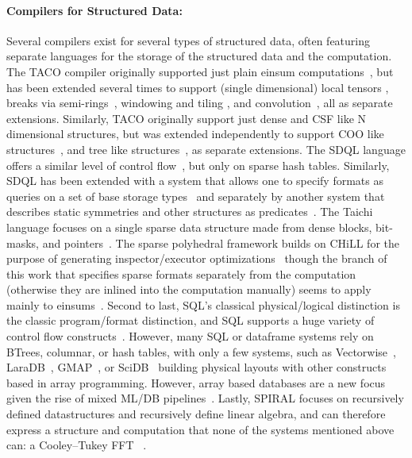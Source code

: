 \paragraph{ Compilers for Structured Data:}
Several compilers exist for several types of structured data, often featuring separate languages for the storage of the structured data and the computation.
%
The TACO compiler originally supported just plain einsum computations~\cite{kjolstad_tensor_2017}, but has been extended several times to support (single dimensional) local tensors \cite{kjolstad_tensor_2019}, breaks via semi-rings~\cite{henry_compilation_2021}, windowing and tiling \cite{senanayake2020sparse}, and convolution~\cite{won2023unified}, all as separate extensions.
%
Similarly, TACO originally support just dense and CSF like N dimensional structures, but was extended independently to support COO like structures~\cite{chou2018format}, and tree like structures~\cite{chou2022compilation}, as separate extensions.
%
The SDQL language offers a similar level of control flow~\cite{shaikhha2022functional}, but only on sparse hash tables.
%
Similarly, SDQL has been extended with a system that allows one to specify formats as queries on a set of base storage types~\cite{schleich2023optimizing} and separately by another system that describes static symmetries and other structures as predicates~\cite{ghorbani2023compiling}.
%
The Taichi language focuses on a single sparse data structure made from dense blocks, bit-masks, and pointers~\cite{hu_taichi_2019}.
%
%
The sparse polyhedral framework builds on CHiLL for the purpose of generating inspector/executor optimizations~\cite{strout2018sparse} though the branch of this work that specifies sparse formats separately from the computation (otherwise they are inlined into the computation manually) seems to apply mainly to einsums~\cite{zhao2022polyhedral}.
%
Second to last, SQL's classical physical/logical distinction is the classic program/format distinction, and SQL supports a huge variety of control flow constructs~\cite{kotlyar1997relational, date1989guide}.
%
However, many SQL or dataframe systems rely on BTrees, columnar, or hash tables, with only a few systems, such as Vectorwise~\cite{boncz2012vectorwise}, LaraDB~\cite{hutchison2017laradb}, GMAP~\cite{tsatalos1996gmap}, or SciDB~\cite{stonebraker2013scidb} building physical layouts with other constructs based in array programming.
%
However, array based databases are a new focus given the rise of mixed ML/DB pipelines~\cite{baumann2021array,luo2018scalable}.
%
Lastly, SPIRAL focuses on recursively defined datastructures and recursively define linear algebra, and can therefore express a structure and computation that none of the systems mentioned above can: a Cooley–Tukey FFT ~\cite{franchetti2018spiral,franchetti2009operator}.
%

